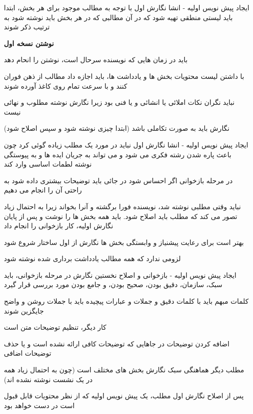 \documentclass[14pt]{beamer}
\newcommand{\framefontsizelarge}{\fontsize{18pt}{0pt}\selectfont}
\newcommand{\frametitlefontsize}{\fontsize{20pt}{0pt}\selectfont}
\begin{document}
\begin{persian}
\begin{frame}{\frametitlefontsize  ایجاد پیش نویس اولیه - انشا نگارش اول }
		با توجه به مطالب موجود برای هر بخش، ابتدا باید لیستی  منطقی تهیه شود که در آن مطالبی که در هر بخش باید نوشته شود به ترتیب ذکر شوند
		
		 \textbf{نوشتن نسخه اول}
		 
		 باید در زمان هایی که نویسنده سرحال است، نوشتن را انحام دهد
		 
		 با داشتن لیست محتویات بخش ها و یادداشت ها، باید اجازه داد مطالب از ذهن فوران کنند و با سرعت تمام روی کاغذ آورده شوند
		 
		 نباید نگران نکات املائی یا انشائی و یا فنی بود زیرا نگارش نوشته مطلوب و نهائی نیست
		 
		 نگارش باید به صورت تکاملی باشد (ابتدا چیزی نوشته شود و سپس اصلاح شود)
	\end{frame}
	
	\begin{frame}{\frametitlefontsize  ایجاد پیش نویس اولیه - انشا نگارش اول }
		\framefontsizelarge
		نباید در مورد یک مطلب زیاده گوئی کرد چون باعث پاره شدن رشته فکری می شود و می تواند به جریان ایده ها و به پیوستگی نوشته لطمات اساسی وارد کند
		
		در مرحله بازخوانی اگر احساس شود در جائی باید توضیحات بیشتری داده شود به راحتی آن را انجام می دهیم
		
		نباید وقتی مطلبی نوشته شد، نویسنده فورا برگشته و آنرا بخواند زیرا به احتمال زیاد تصور می کند که مطلب باید اصلاح شود. باید همه بخش ها را نوشت و پس از پایان نگارش اولیه، کار بازخوانی را انجام داد
		
		بهتر است برای رعایت پیشنیاز و وابستگی بخش ها نگارش از اول ساختار شروع شود 
		
		لزومی ندارد که همه مطالب یادداشت برداری شده نوشته شود
	\end{frame}
	
	\begin{frame}{\frametitlefontsize  ایجاد پیش نویس اولیه - بازخوانی و اصلاح نخستین نگارش }
		\framefontsizelarge
		در مرحله بازخوانی، باید سبک، سازمان، دقیق بودن، صحیح بودن، و جامع بودن مورد بررسی قرار گیرد
		
		کلمات مبهم باید با کلمات دقیق و جملات و عبارات پیچیده باید با جملات روشن و واضح جایگزین شوند
		
		کار دیگر، تنظیم توضیحات متن است
		
		اضافه کردن توضیحات در جاهایی که توضیحات کافی ارائه نشده است و یا حذف توضیحات اضافی
		
		مطلب دیگر هماهنگی سبک نگارش بخش های مختلف است (چون به احتمال زیاد همه در یک نشست نوشته نشده اند)
		
		پس از اصلاح نگارش اول مطلب، یک پیش نویس اولیه که از نظر محتویات قابل قبول است در دست خواهد بود
	\end{frame}

\end{persian}
\end{document}

